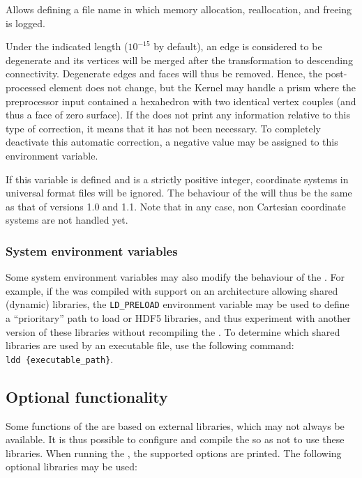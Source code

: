 {{{Allows defining a file name in which memory allocation, reallocation,
and freeing is logged.


Under the indicated length ($10^{-15}$ by default), an edge is considered
to be degenerate and its vertices will be merged after the transformation
to descending connectivity. Degenerate edges and faces will thus be
removed. Hence, the post-processed element does not change, but the
Kernel may handle a prism where the preprocessor input contained a
hexahedron with two identical vertex couples (and thus a face of zero
surface). If the \pcs does not print any information relative to this
type of correction, it means that it has not been necessary. To completely
deactivate this automatic correction, a negative value may be assigned
to this environment variable.


If this variable is defined and is a strictly positive integer, coordinate
systems in \ideas universal format files will be ignored. The behaviour
of the \pcs will thus be the same as that of versions 1.0 and 1.1.
Note that in any case, non Cartesian coordinate systems are not handled yet.

\subsubsection{System environment variables\label{sec:envpcs:sys}}

Some system environment variables may also modify the behaviour of
the \pcs. For example, if the \pcs was compiled with \med support
on an architecture allowing shared (dynamic) libraries, the
\texttt {LD\_PRELOAD} environment variable may be used to define a
``prioritary'' path to load \med or HDF5 libraries, and thus experiment
with another version of these libraries without recompiling the \pcs.
To determine which shared libraries are used by an executable file, use
the following command: \texttt{ldd~\{executable\_path\}}.

\subsection{Optional functionality\label{sec:pcs:lib_opt}}

Some functions of the \pcs are based on external libraries,
which may not always be available. It is thus possible to configure
and compile the \pcs so as not to use these libraries.
When running the \pcs, the supported options are printed.
The following optional libraries may be used:

}}}
